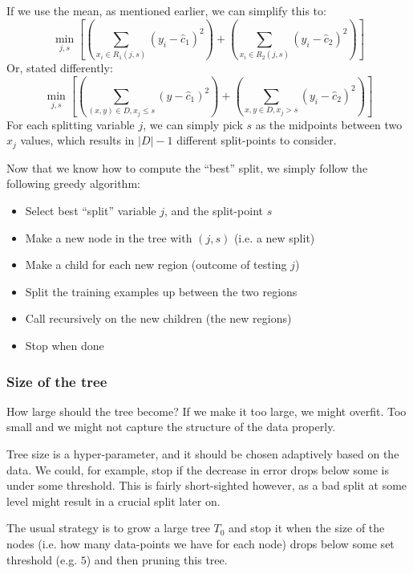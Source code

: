     If we use the mean, as mentioned earlier, we can simplify this to:
    \begin{equation*}
    \min_{j,s}\left[ \left(\sum_{x_i \in R_1(j,s)} (y_i - \hat{c}_1)^2 \right) 
    + \left(\sum_{x_i \in R_2(j,s)} (y_i - \hat{c}_2)^2 \right) \right]
    \end{equation*}
    Or, stated differently:
    \begin{equation*}
    \min_{j,s}\left[ \left(\sum_{(x, y) \in D, x_j \leq s} (y - \hat{c}_1)^2 
    \right) + \left(\sum_{x,y \in D, x_j > s} (y_i - \hat{c}_2)^2 \right) 
    \right]
    \end{equation*}
    For each splitting variable $j$, we can simply pick $s$ as the midpoints 
    between two $x_j$ values, which results in $|D| - 1$ different split-points 
    to consider.
    
    Now that we know how to compute the ``best'' split, we simply follow the 
    following greedy algorithm:
    \begin{itemize}
        \item Select best ``split'' variable $j$, and the split-point $s$
        \item Make a new node in the tree with $(j,s)$ (i.e. a new split)
        \item Make a child for each new region (outcome of testing $j$)
        \item Split the training examples up between the two regions
        \item Call recursively on the new children (the new regions)
        \item Stop when done
    \end{itemize}
    
    \subsubsection{Size of the tree}
    How large should the tree become? If we make it too large, we might 
    overfit. Too small and we might not capture the structure of the data 
    properly.
    
    Tree size is a hyper-parameter, and it should be chosen adaptively based on 
    the data. We could, for example, stop if the decrease in error drops below 
    some is under some threshold. This is fairly short-sighted however, as a 
    bad split at some level might result in a crucial split later on.
    
    The usual strategy is to grow a large tree $T_0$ and stop it when the size 
    of the nodes (i.e. how many data-points we have for each node) drops below 
    some set threshold (e.g. $5$) and then pruning this tree.
    
